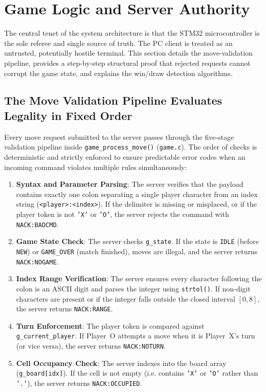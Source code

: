 \section{Game Logic and Server Authority}
\label{sec:authority}


The central tenet of the system architecture is that the STM32 microcontroller is the sole referee and single source of truth.
The PC client is treated as an untrusted, potentially hostile terminal.
This section details the move-validation pipeline, provides a step-by-step structural proof that rejected requests cannot corrupt the game state, and explains the win/draw detection algorithms.

\subsection{The Move Validation Pipeline Evaluates Legality in Fixed Order}

Every move request submitted to the server passes through the five-stage validation pipeline inside \texttt{game\_process\_move()} (\texttt{game.c}).
The order of checks is deterministic and strictly enforced to ensure predictable error codes when an incoming command violates multiple rules simultaneously:

\begin{enumerate}
    \item \textbf{Syntax and Parameter Parsing}: The server verifies that the payload contains exactly one colon separating a single player character from an index string (\texttt{<player>:<index>}). If the delimiter is missing or misplaced, or if the player token is not \texttt{'X'} or \texttt{'O'}, the server rejects the command with \texttt{NACK:BADCMD}.
    \item \textbf{Game State Check}: The server checks \texttt{g\_state}. If the state is \texttt{IDLE} (before \texttt{NEW}) or \texttt{GAME\_OVER} (match finished), moves are illegal, and the server returns \texttt{NACK:NOGAME}.
    \item \textbf{Index Range Verification}: The server ensures every character following the colon is an ASCII digit and parses the integer using \texttt{strtol()}. If non-digit characters are present or if the integer falls outside the closed interval $[0, 8]$, the server returns \texttt{NACK:RANGE}.
    \item \textbf{Turn Enforcement}: The player token is compared against \texttt{g\_current\_player}. If Player~O attempts a move when it is Player~X's turn (or vice versa), the server returns \texttt{NACK:NOTURN}.
    \item \textbf{Cell Occupancy Check}: The server indexes into the board array (\texttt{g\_board[idx]}). If the cell is not empty (i.e. contains \texttt{'X'} or \texttt{'O'} rather than \texttt{'.'}), the server returns \texttt{NACK:OCCUPIED}.
\end{enumerate}

